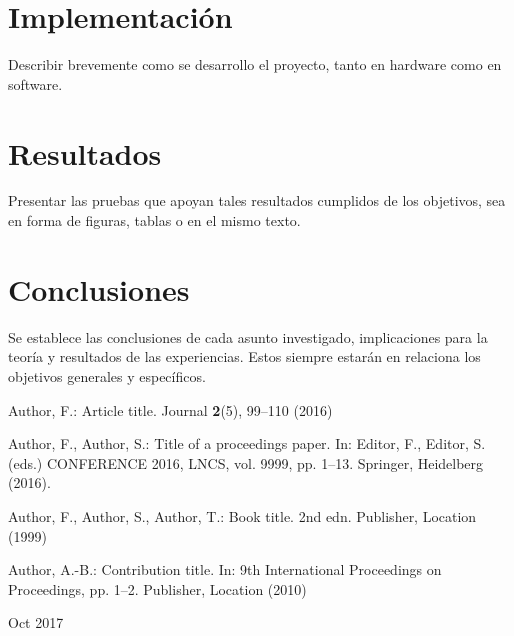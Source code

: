 \documentclass[12pt]{report}
\begin{document}
\chapter{Implementación}
Describir brevemente como se desarrollo el proyecto, tanto en hardware como en software.
\chapter{Resultados}
Presentar las pruebas que apoyan tales resultados cumplidos de los objetivos, sea en forma de figuras, tablas o en el mismo texto. 
\chapter{Conclusiones}
Se establece las conclusiones de cada asunto investigado, implicaciones para la teoría y resultados de las
experiencias. Estos siempre estarán en relaciona los objetivos generales y específicos.

% 
% 

\begin{thebibliography}{8}
Author, F.: Article title. Journal \textbf{2}(5), 99--110 (2016)

Author, F., Author, S.: Title of a proceedings paper. In: Editor,
F., Editor, S. (eds.) CONFERENCE 2016, LNCS, vol. 9999, pp. 1--13.
Springer, Heidelberg (2016).

Author, F., Author, S., Author, T.: Book title. 2nd edn. Publisher,
Location (1999)

Author, A.-B.: Contribution title. In: 9th International Proceedings
on Proceedings, pp. 1--2. Publisher, Location (2010)

Oct 2017
\end{thebibliography}
\end{document}
